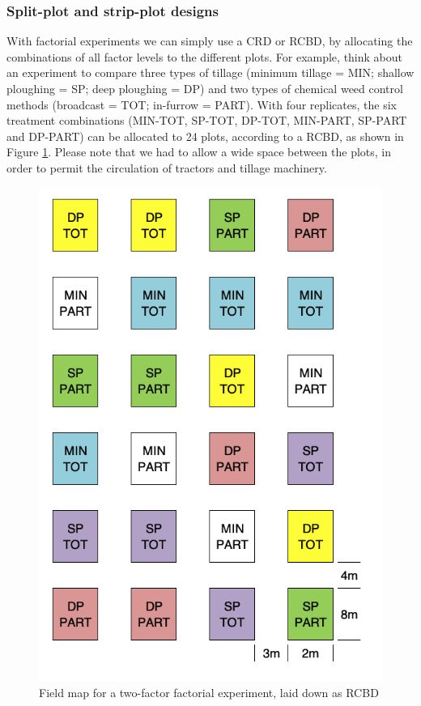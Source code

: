 \documentclass[a4paper,12pt,oneside]{book}
\begin{document}
\hypertarget{split-plot-and-strip-plot-designs}{%
\subsubsection{Split-plot and strip-plot designs}\label{split-plot-and-strip-plot-designs}}

With factorial experiments we can simply use a CRD or RCBD, by allocating the combinations of all factor levels to the different plots. For example, think about an experiment to compare three types of tillage (minimum tillage = MIN; shallow ploughing = SP; deep ploughing = DP) and two types of chemical weed control methods (broadcast = TOT; in-furrow = PART). With four replicates, the six treatment combinations (MIN-TOT, SP-TOT, DP-TOT, MIN-PART, SP-PART and DP-PART) can be allocated to 24 plots, according to a RCBD, as shown in Figure \ref{fig:figName37}. Please note that we had to allow a wide space between the plots, in order to permit the circulation of tractors and tillage machinery.

\begin{figure}

{\centering \includegraphics[width=0.75\linewidth]{_images/Mappa3FATT} 

}

\caption{Field map for a two-factor factorial experiment, laid down as RCBD}\label{fig:figName37}
\end{figure}
\end{document}
